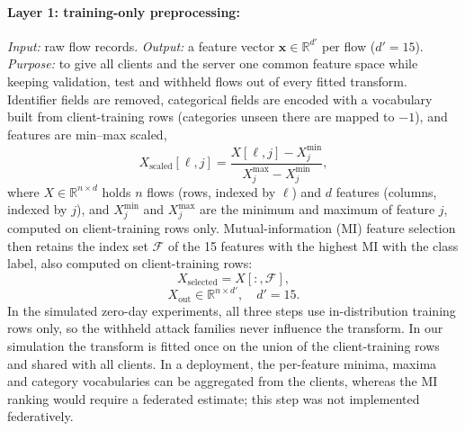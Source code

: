 \documentclass[pdflatex,sn-mathphys-num]{sn-jnl}
\begin{document}
{{\paragraph{Layer 1: training-only preprocessing:} \emph{Input:} raw flow records. 
\emph{Output:} a feature vector $\mathbf{x}\in\mathbb{R}^{d'}$ per flow ($d'=15$). \emph{Purpose:} to give all clients and the server one common feature space while keeping validation, test and withheld flows out of every fitted transform. Identifier fields are removed, categorical fields are encoded with a vocabulary built from client-training rows (categories unseen there are mapped to $-1$), and features are min--max scaled,
\begin{equation}
X_{\mathrm{scaled}}[\ell,j]=\frac{X[\ell,j]-X_j^{\min}}{X_j^{\max}-X_j^{\min}},\label{eq:minmax}
\end{equation}
where $X\in\mathbb{R}^{n\times d}$ holds $n$ flows (rows, indexed by $\ell$) and $d$ features (columns, indexed by $j$), and $X_j^{\min}$ and $X_j^{\max}$ are the minimum and maximum of feature $j$, computed on client-training rows only. Mutual-information (MI) feature selection then retains the index set $\mathcal{F}$ of the 15 features with the highest MI with the class label, also computed on client-training rows:
\begin{equation}
X_{\mathrm{selected}}=X[:,\mathcal{F}],\label{eq:select_features}
\end{equation}
\begin{equation}
X_{\mathrm{out}}\in\mathbb{R}^{n\times d'},\quad d'=15.\label{eq:xout}
\end{equation}
In the simulated zero-day experiments, all three steps use in-distribution training rows only, so the withheld attack families never influence the transform. In our simulation the transform is fitted once on the union of the client-training rows and shared with all clients. In a deployment, the per-feature minima, maxima and category vocabularies can be aggregated from the clients, whereas the MI ranking would require a federated estimate; this step was not implemented federatively.}
{\color{black}
}}
\end{document}
